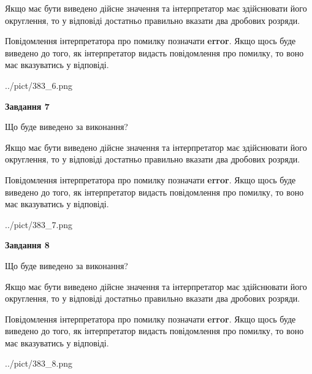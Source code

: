 \documentclass[12pt, ukrainian]{article}
\begin{document}
{\begin {Large}
Якщо має бути виведено дійсне значення та інтерпретатор має здійснювати його округлення, 
то у відповіді достатньо правильно вказати два дробових розряди.

Повідомлення інтерпретатора про помилку позначати \textbf{error}.
Якщо щось буде виведено до того, як інтерпретатор видасть повідомлення про помилку, 
то воно має вказуватись у відповіді. \par

\begin{center}
	{../pict/383_6.png}
\end{center}
\newpage

{\begin {center}\textbf{Завдання 7}\end {center}}\par
Що буде виведено за виконання? \par

Якщо має бути виведено дійсне значення та інтерпретатор має здійснювати його округлення, 
то у відповіді достатньо правильно вказати два дробових розряди.

Повідомлення інтерпретатора про помилку позначати \textbf{error}.
Якщо щось буде виведено до того, як інтерпретатор видасть повідомлення про помилку, 
то воно має вказуватись у відповіді. \par

\begin{center}
	{../pict/383_7.png}
\end{center}
\newpage

{\begin {center}\textbf{Завдання 8}\end {center}}\par
Що буде виведено за виконання? \par

Якщо має бути виведено дійсне значення та інтерпретатор має здійснювати його округлення, 
то у відповіді достатньо правильно вказати два дробових розряди.

Повідомлення інтерпретатора про помилку позначати \textbf{error}.
Якщо щось буде виведено до того, як інтерпретатор видасть повідомлення про помилку, 
то воно має вказуватись у відповіді. \par

\begin{center}
	{../pict/383_8.png}
\end{center}
\newpage


\end{Large}}
\end{document}
